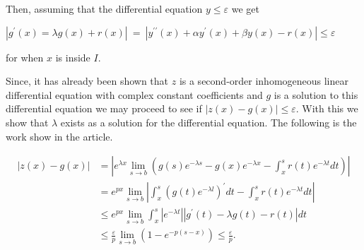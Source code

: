 \documentclass[mla8]{mla}
\begin{document}
\begin{paper}
Then, assuming that the differential equation $\mathit{y} \leq \varepsilon$ we get
\begin{center}
    $|g^\prime (x)= \lambda g(x) + r(x)|\ =\ |y^{\prime \prime}(x)+\alpha y^{\prime}(x)+\beta y(x)-r(x)| \leq \varepsilon$
\end{center}

for when $x$ is inside $\mathit{I}$.

Since, it has already been shown that $\mathit{z}$ is a second-order inhomogeneous linear differential equation with complex constant coefficients and $\mathit{g}$ is a solution to this differential equation we may proceed to see if $|z(x) - g(x)| \leq \varepsilon$. With this we show that $\lambda$ exists as a solution for the differential equation. The following is the work show in the article.

$$\begin{aligned}
    |z(x)-g(x)| & =\left|e^{\lambda x} \lim _{s \rightarrow b}\left(g(s) e^{-\lambda s}-g(x) e^{-\lambda x}-\int_x^s r(t) e^{-\lambda t} d t\right)\right| \\ & =e^{p x} \lim _{s \rightarrow b}\left|\int_x^s\left(g(t) e^{-\lambda l}\right)^{\prime} d t-\int_x^s r(t) e^{-\lambda t} d t\right| \\ & \leq e^{p x} \lim _{s \rightarrow b} \int_x^s\left|e^{-\lambda t}\right|\left|g^{\prime}(t)-\lambda g(t)-r(t)\right| d t \\ & \leq \frac{\varepsilon}{p} \lim _{s \rightarrow b}\left(1-e^{-p(s-x)}\right) \leq \frac{\varepsilon}{p} .
\end{aligned}$$


\end{paper}
\printbibliography
\end{document}
